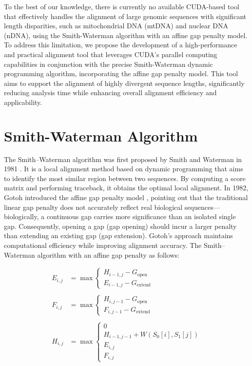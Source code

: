 \documentclass[PhD]{PHlab-thesis}
\begin{document}
To the best of our knowledge, there is currently no available CUDA-based tool that effectively handles the alignment of large genomic sequences with significant length disparities, such as mitochondrial DNA (mtDNA) and nuclear DNA (nDNA), using the Smith-Waterman algorithm with an affine gap penalty model. To address this limitation, we propose the development of a high-performance and practical alignment tool that leverages CUDA's parallel computing capabilities in conjunction with the precise Smith-Waterman dynamic programming algorithm, incorporating the affine gap penalty model. This tool aims to support the alignment of highly divergent sequence lengths, significantly reducing analysis time while enhancing overall alignment efficiency and applicability.

\section{Smith-Waterman Algorithm}
The Smith–Waterman algorithm was first proposed by Smith and Waterman in 1981 \cite{Smith-Waterman}. It is a local alignment method based on dynamic programming that aims to identify the most similar region between two sequences. By computing a score matrix and performing traceback, it obtains the optimal local alignment.
In 1982, Gotoh introduced the affine gap penalty model \cite{Affine-Gap}, pointing out that the traditional linear gap penalty does not accurately reflect real biological sequences—biologically, a continuous gap carries more significance than an isolated single gap. Consequently, opening a gap (gap opening) should incur a larger penalty than extending an existing gap (gap extension). Gotoh’s approach maintains computational efficiency while improving alignment accuracy.
The Smith–Waterman algorithm with an affine gap penalty as follows:

\[
\begin{alignedat}{2}
E_{i,j} &= \max \left\{ 
    \begin{array}{l}
        H_{i-1,j} - G_{\text{open}} \\
        E_{i-1,j} - G_{\text{extend}}
    \end{array} \right. \\
    \\
F_{i,j} &= \max \left\{
    \begin{array}{l}
        H_{i,j-1} - G_{\text{open}} \\
        F_{i,j-1} - G_{\text{extend}}
    \end{array} \right. \\
    \\
H_{i,j} &= \max \left\{
    \begin{array}{l}
        0 \\
        H_{i-1,j-1} + W(S_0[i], S_1[j]) \\
        E_{i,j} \\
        F_{i,j}
    \end{array} \right.
\end{alignedat}
\]
\end{document}
